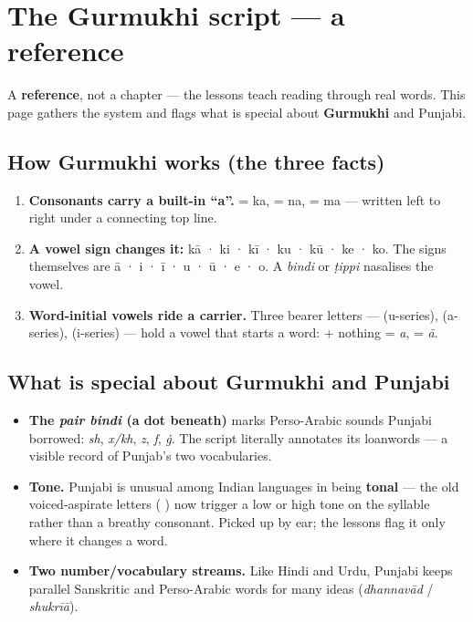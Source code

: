 
\chapter*{The Gurmukhi script --- a reference}

A \textbf{reference}, not a chapter — the lessons teach reading through real words. This page gathers the system and flags what is special about \textbf{Gurmukhi} and Punjabi.

\section*{How Gurmukhi works (the three facts)}

\begin{enumerate}
\raggedright
\setlength{\itemsep}{0.35em}
  \item \textbf{Consonants carry a built-in \textquotedblleft{}a\textquotedblright{}.}  = ka,  = na,  = ma — written left to right under a connecting top line.
  \item \textbf{A vowel sign changes it:}  kā ·  ki ·  kī ·  ku ·  kū ·  ke ·  ko. The signs themselves are \textbf{} ā · \textbf{} i · \textbf{} ī · \textbf{} u · \textbf{} ū · \textbf{} e · \textbf{} o. A \emph{bindi}  or \emph{ṭippi}  nasalises the vowel.
  \item \textbf{Word-initial vowels ride a carrier.} Three bearer letters —  (u-series),  (a-series),  (i-series) — hold a vowel that starts a word:  + nothing = \emph{a},  = \emph{ā}.
\end{enumerate}

\section*{What is special about Gurmukhi and Punjabi}

\begin{itemize}
\raggedright
\setlength{\itemsep}{0.35em}
  \item \textbf{The \emph{pair bindi} (a dot beneath)} marks Perso-Arabic sounds Punjabi borrowed:  \emph{sh},  \emph{x/kh},  \emph{z},  \emph{f},  \emph{ġ}. The script literally annotates its loanwords — a visible record of Punjab's two vocabularies.
  \item \textbf{Tone.} Punjabi is unusual among Indian languages in being \textbf{tonal} — the old voiced-aspirate letters (    ) now trigger a low or high tone on the syllable rather than a breathy consonant. Picked up by ear; the lessons flag it only where it changes a word.
  \item \textbf{Two number/vocabulary streams.} Like Hindi and Urdu, Punjabi keeps parallel Sanskritic and Perso-Arabic words for many ideas (\emph{dhannavād} / \emph{shukrīā}).
\end{itemize}


